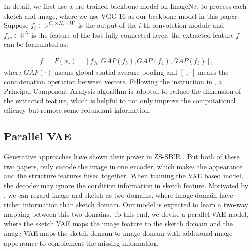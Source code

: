 \documentclass[10pt,twocolumn,letterpaper]{article}
\begin{document}
In detail, we first use a pre-trained backbone model on ImageNet \cite{deng2009imagenet} to process each sketch and image, where we use VGG-16 as our backbone model in this paper. 
Suppose $f_i \in \mathbb{R}^{C_i \times H_i \times W_i}$ is the output of the $i$-th convolution module and $f_{fc} \in \mathbb{R}^{N}$ is the feature of the last fully connected layer, the extracted feature $f^{\cdot}$ can be formulated as:

\begin{align}
f^{\cdot} = F(x_i^{\cdot}) = [f_{fc}, GAP(f_5), GAP(f_4), GAP(f_3)],
\end{align}
where $GAP(\cdot)$ means global spatial average pooling and $[\cdot,\cdot]$ means the concatenation operation between vectors. Following the instruction in \cite{wang2019stacked}, a Principal Component Analysis algorithm is adopted to reduce the dimension of the extracted feature, which is helpful to not only improve the computational effiency but remove some redundant information.

\subsection{Parallel VAE} \label{3.3}
Generative approaches have shown their power in ZS-SBIR \cite{wang2019stacked,yelamarthi2018zero}. But both of these two papers, only encode the image in one encoder, which makes the appearance and the structure features fused together. When training the VAE based model, the decoder may ignore the condition information in sketch feature. Motivated by \cite{zhu2017toward}, we can regard image and sketch as two domains, where image domain have richer information than sketch domain. Our model is expected to learn a two-way mapping between this two domains. To this end, we devise a parallel VAE model, where the sketch VAE maps the image feature to the sketch domain and the image VAE maps the sketch domain to image domain with additional image appearance to complement the missing information.
\end{document}
